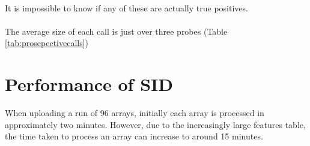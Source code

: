 \paragraph*{}
It is impossible to know if any of these are actually true positives.

\paragraph*{}
The average size of each call is just over three probes (Table \ref{tab:prosepectivecalls})

\begin{table}[]
\centering
\caption[Prospective cases: The number and size of calls]{Prospective cases: The average and maximum number of probes within a call during analysis of 121 prospective arrays.}
\label{tab:prosepectivecalls}
\end{table}

\section{Performance of SID}
When uploading a run of 96 arrays, initially each array is processed in approximately two minutes. However, due to the increasingly large features table, the time taken to process an array can increase to around 15 minutes.